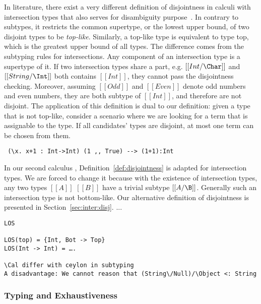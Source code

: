 In literature, there exist a very different definition of disjointness
in calculi with intersection types that also serves for disambiguity
purpose~\cite{oliveira2016disjoint}.
In contrary to subtypes, it restricts the common supertype, or the lowest
upper bound, of two disjoint types to be \emph{top-like}.
Similarly, a top-like type is equivalent to type top, which is the greatest
upper bound of all types.
The difference comes from the subtyping rules for intersections.
Any component of an intersection type is a supertype of it.
If two intersection types share a part, e.g. $[[Int/\Char]]$ and $[[String/\Int]]$
both contains $[[Int]]$, they cannot pass the disjointness checking.
Moreover, assuming $[[Odd]]$ and $[[Even]]$ denote odd numbers and even numbers,
they are both subtype of $[[Int]]$, and therefore are not disjoint.
The application of this definition is dual to our definition:
given a type that is not top-like, consider a scenario where we are looking for
a term that is assignable to the type. If all candidates' types are disjoint, 
at most one term can be chosen from them.
\begin{verbatim}
 (\x. x+1 : Int->Int) (1 ,, True) --> (1+1):Int
\end{verbatim}


In our second calculus , Definition~\ref{def:disjointness} is adapted
for intersection types.
We are forced to change it because with the existence of intersection types,
any two types $[[A]]$ $[[B]]$ have a trivial subtype $[[A/\B]]$. Generally such an intersection type is not bottom-like.
Our alternative definition of disjointness is presented in Section~\ref{sec:inter:disj}.
...



\begin{verbatim}
LOS

LOS(top) = {Int, Bot -> Top}
LOS(Int -> Int) = ….

\Cal differ with ceylon in subtyping
A disadvantage: We cannot reason that (String\/Null)/\Object <: String
\end{verbatim}

\subsubsection*{Typing and Exhaustiveness}


